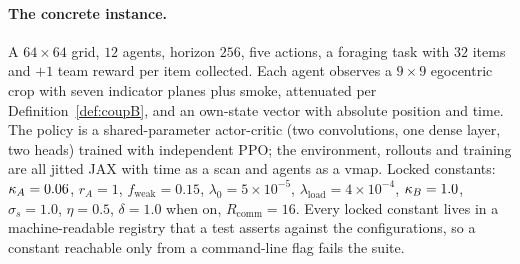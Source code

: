 \paragraph{The concrete instance.} A $64 \times 64$ grid, $12$ agents,
horizon $256$, five actions, a foraging task with $32$ items and $+1$ team
reward per item collected. Each agent observes a $9 \times 9$ egocentric crop
with seven indicator planes plus smoke, attenuated per Definition~\ref{def:coupB},
and an own-state vector with absolute position and time. The policy is a
shared-parameter actor-critic (two convolutions, one dense layer, two heads)
trained with independent PPO; the environment, rollouts and training are all
jitted JAX with time as a scan and agents as a vmap. Locked constants:
$\kappa_A = 0.06$, $r_A = 1$, $f_{\mathrm{weak}} = 0.15$, $\lambda_0 = 5\times
10^{-5}$, $\lambda_{\mathrm{load}} = 4 \times 10^{-4}$, $\kappa_B = 1.0$,
$\sigma_s = 1.0$, $\eta = 0.5$, $\delta = 1.0$ when on, $R_{\mathrm{comm}} =
16$. Every locked constant lives in a machine-readable registry that a test
asserts against the configurations, so a constant reachable only from a
command-line flag fails the suite.
